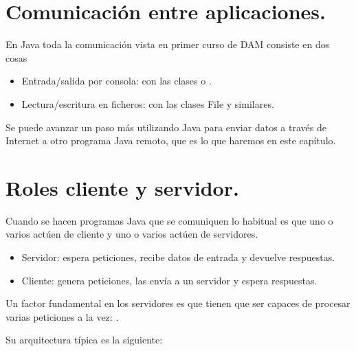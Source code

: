 \documentclass[letterpaper,10pt,spanish]{sphinxmanual}
\begin{document}
\section{Comunicación entre aplicaciones.}
\label{\detokenize{textos/tema3:comunicacion-entre-aplicaciones}}
En Java toda la comunicación vista en primer curso de DAM consiste en dos cosas
\begin{itemize}
\item {} 
Entrada/salida por consola: con las clases  o .

\item {} 
Lectura/escritura en ficheros: con las clases File y similares.

\end{itemize}

Se puede avanzar un paso más utilizando Java para enviar datos a través de Internet a otro programa Java remoto, que es lo que haremos en este capítulo.


\section{Roles cliente y servidor.}
\label{\detokenize{textos/tema3:roles-cliente-y-servidor}}
Cuando se hacen programas Java que se comuniquen lo habitual es que uno o varios actúen de cliente y uno o varios actúen de servidores.
\begin{itemize}
\item {} 
Servidor: espera peticiones, recibe datos de entrada y devuelve respuestas.

\item {} 
Cliente: genera peticiones, las envía a un servidor y espera respuestas.

\end{itemize}

Un factor fundamental en los servidores es que tienen que ser capaces de procesar varias peticiones a la vez: .

Su arquitectura típica es la siguiente:

%
\begin{sphinxVerbatim}[commandchars=\\\{\}]
 
         
\end{sphinxVerbatim}
\end{document}
